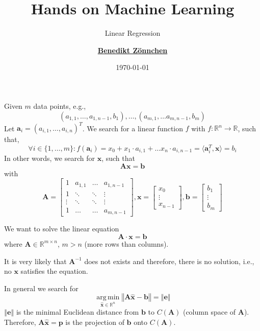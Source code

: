 \documentclass[aspectratio=169]{beamer}
\title{Hands on Machine Learning}
\subtitle{Linear Regression}
\author{\href{mailto:zoennchen.benedikt@hm.edu}{\textbf{Benedikt Z\"onnchen}}}
\date{\today}
\newcommand{\A}{\mathbf{A}}
\newcommand{\xx}{\mathbf{x}}
\newcommand{\bb}{\mathbf{b}}
\newcommand{\ee}{\mathbf{e}}
\newcommand{\pp}{\mathbf{p}}
\newcommand\inner[2]{\langle #1, #2 \rangle }
\newcommand{\R}{\mathbb{R}}
\DeclareMathOperator*{\argmin}{arg\,min}
\begin{document}
	
	\begin{frame}
		\titlepage
	\end{frame}

	\begin{frame}
		Given $m$ data points, e.g., 
		\begin{equation*}
			(a_{1,1}, \ldots, a_{1,n-1}, b_1), \ldots, (a_{m,1}, \ldots a_{m,n-1}, b_m)
		\end{equation*}
		Let $\mathbf{a}_i = (a_{i,1}, \ldots, a_{i,n})^T$.
		We search for a linear function $f$ with $f : \mathbb{R}^n \rightarrow \mathbb{R}$, such that,
		\begin{equation*}
			\forall i \in \{1,\ldots, m\}: f(\mathbf{a}_i) = x_0 + x_1 \cdot a_{i,1} + \ldots x_n \cdot a_{i,n-1} = \inner{\mathbf{a}_i^T}{\xx} = b_i
		\end{equation*}
		In other words, we search for $\xx$, such that
		\begin{equation*}
			\A \xx = \bb
		\end{equation*}
		with 
		\begin{equation*}
			\A = \begin{bmatrix}
				1 & a_{1,1} & \ldots & a_{1, n-1} \\
				1 & \ddots & \ddots & \vdots \\
				\vdots & \ddots & \ddots & \vdots \\
				1 & \ldots & \ldots & a_{m,n-1} 
			\end{bmatrix}, \xx = \begin{bmatrix} x_0 \\ \vdots \\ x_{n-1} \end{bmatrix}, \bb = \begin{bmatrix} b_1 \\ \vdots \\ b_{m} \end{bmatrix}
		\end{equation*}
	\end{frame}

	\begin{frame}
		
	\end{frame}

	\begin{frame}
		We want to solve the linear equation
		\begin{equation}
			\A \cdot \xx = \bb
		\end{equation}
		where $\A \in \mathbb{R}^{m \times n}$, $m > n$ (more rows than columns).
		\begin{flushleft}
			It is very likely that $\A^{-1}$ does not exists and therefore, there is no solution, i.e., no $\xx$ satisfies the equation.
		\end{flushleft}
		In general we search for
		\begin{equation}
			\argmin\limits_{\hat{\xx} \in \R^n} \left\Vert  \A\hat{\xx} - \bb \right\Vert = \left\Vert \ee \right\Vert
		\end{equation}
		$\left\Vert \ee \right\Vert$ is the minimal Euclidean distance from $\bb$ to $C(\A)$ (column space of $\A$).
		Therefore, $\A\hat{\xx} = \pp$ is the projection of $\bb$ onto $C(\A)$.
	\end{frame}
\end{document}
